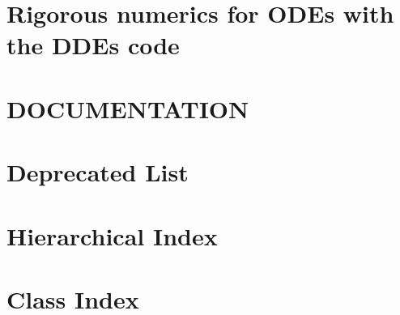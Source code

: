 \let\mypdfximage\pdfximage\def\pdfximage{\immediate\mypdfximage}\documentclass[twoside]{book}
\newcommand{\+}{\discretionary{\mbox{\scriptsize$\hookleftarrow$}}{}{}}
\begin{document}
\chapter{Rigorous numerics for O\+D\+Es with the D\+D\+Es code}
\label{md__home_robson_ROBERT-PRACA-CHMURA_eclipse-workspace_capdDDEs5_81_82_programs_examples_rossler-ode-vs-dde-code_README}

\chapter{D\+O\+C\+U\+M\+E\+N\+T\+A\+T\+I\+ON}
\label{md__home_robson_ROBERT-PRACA-CHMURA_eclipse-workspace_capdDDEs5_81_82_docs_README}

\chapter{Deprecated List}
\label{deprecated}

\chapter{Hierarchical Index}

\chapter{Class Index}

\end{document}
